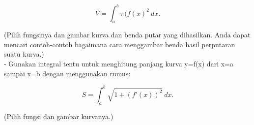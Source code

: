\documentclass{article}
\begin{document}
\begin{eulernotebook}
\begin{eulercomment}
\begin{eulercomment}
\begin{eulercomment}
\end{eulercomment}
\begin{eulerformula}
\[
V = \int_a^b \pi (f(x)^2\ dx.
\]
\end{eulerformula}
\begin{eulercomment}
(Pilih fungsinya dan gambar kurva dan benda putar yang dihasilkan.
Anda dapat mencari contoh-contoh bagaimana cara menggambar benda hasil
perputaran suatu kurva.)\\
- Gunakan integral tentu untuk menghitung panjang kurva y=f(x) dari
x=a sampai x=b dengan menggunakan rumus:

\end{eulercomment}
\begin{eulerformula}
\[
S = \int_a^b \sqrt{1+(f'(x))^2} \ dx.
\]
\end{eulerformula}
\begin{eulercomment}
(Pilih fungsi dan gambar kurvanya.)


\end{eulercomment}
\end{eulercomment}
\end{eulercomment}
\end{eulernotebook}
\end{document}
